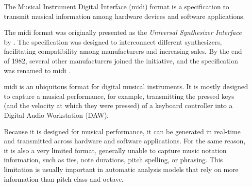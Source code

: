 


The Musical Instrument Digital Interface (\gls{midi}) format is a
specification to transmit musical information among hardware
devices and software applications.

The \gls{midi} format was originally presented as the
\emph{Universal Synthesizer Interface} by
\textcite{smith1981usi}. The specification was
designed to interconnect different synthesizers,
facilitating compatibility among manufacturers and
increasing sales. By the end of 1982, several other
manufacturers joined the initiative, and the specification
was renamed to \gls{midi} \parencite{moog1986midi}.


\gls{midi} is an ubiquitous format for digital musical instruments. It is mostly designed to capture a musical performance, for example, transmitting the pressed keys (and the velocity at which they were pressed) of a keyboard controller into a Digital Audio Workstation (DAW).

Because it is designed for musical performance, it can be generated in real-time and transmitted across hardware and software applications. For the same reason, it is also a very limited format, generally unable to capture music notation information, such as ties, note durations, pitch spelling, or phrasing. This limitation is usually important in automatic analysis models that rely on more information than pitch class and octave.


